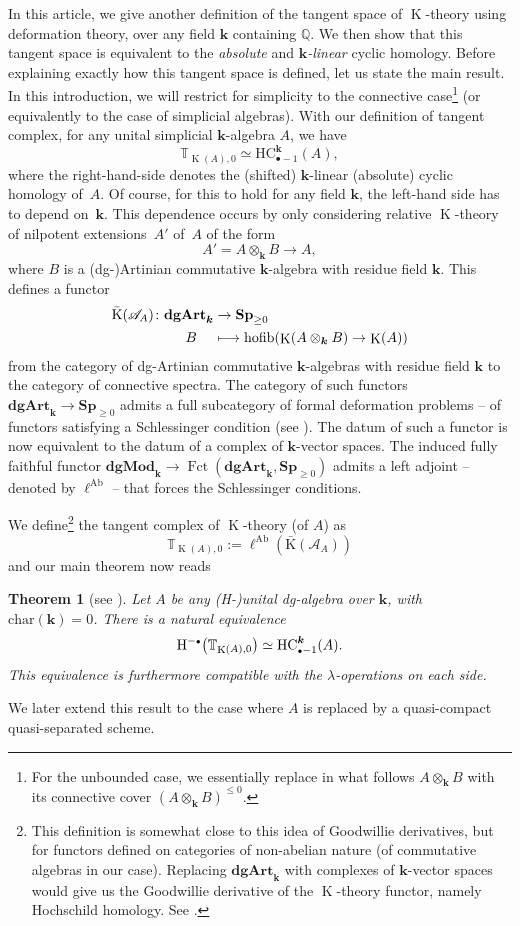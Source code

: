 \documentclass[JEP,XML,SOM,Unicode,NoEqCountersInSection]{cedram}
\let\mathcal\mathscr
\let\autoref\Cref
\newcommand\mto{\mathchoice{\longmapsto}{\mapsto}{\mapsto}{\mapsto}}
\let\ra\rightarrow
\let\widebar\bar
\newcounter{condition}
\newcommand{\sbullet}{{\scriptscriptstyle\bullet}}
\newtheorem{thmintro}{Theorem}
\theoremstyle{definition}
\newcommand{\Q}{\mathbb{Q}}
\newcommand{\T}{\mathbb{T}}
\newcommand{\Sp}{\mathbf{Sp}}
\newcommand{\dgArt}{\mathbf{dgArt}}
\newcommand{\dgMod}{\mathbf{dgMod}}
\DeclareMathOperator{\Fct}{Fct}
\DeclareMathOperator{\K}{K}
\newcommand{\homol}{\mathrm H}
\let\originalleft\left
\let\originalright\right
\renewcommand{\left}{\mathopen{}\mathclose\bgroup\originalleft}
\renewcommand{\right}{\aftergroup\egroup\originalright}
\newcommand{\bK}{\widebar{\mathrm{K}}}
\newcommand{\HC}{\mathrm{HC}}
\renewcommand{\k}{{\boldsymbol{k}}}
\newcommand{\ellAb}{\operatorname{\ell^{Ab}}}
\newcommand{\Ac}{\mathcal{A}}
\newcommand{\hofib}{\operatorname{hofib}}
\begin{document}
In this article, we give another definition of the tangent space of $\K$-theory using deformation theory, over any field $\k$ containing $\Q$. We then show that this tangent space is equivalent to the \emph{absolute} and \emph{$\k$-linear} cyclic homology. Before explaining exactly how this tangent space is defined, let us state the main result. In this introduction, we will restrict for simplicity to the connective case\footnote{For the unbounded case, we essentially replace in what follows $A \otimes_\k B$ with its connective cover $(A \otimes_\k B)^{\leq 0}$.} (or equivalently to the case of simplicial algebras).
With our definition of tangent complex, for any unital simplicial $\k$-algebra $A$, we have
\[
\T_{\K(A),0} \simeq \HC_{\sbullet-1}^\k(A),
\]
where the right-hand-side denotes the (shifted) $\k$-linear (absolute) cyclic homology of~$A$. Of course, for this to hold for any field $\k$, the left-hand side has to depend on~$\k$.
This dependence occurs by only considering relative $\K$-theory of nilpotent exten\-sions~$A'$ of~$A$ of the form
\[
A' = A \otimes_\k B \to A,
\]
where $B$ is a (dg-)Artinian commutative $\k$-algebra with residue field $\k$.
This defines a functor
\begin{align*}
\bK(\Ac_A) \colon \dgArt_\k &\to \Sp_{\geq 0} \\
B \hspace{1.2em} & \mto \hofib\left(\K\left(A \otimes_\k B\right) \ra \K(A) \right)
\end{align*}
from the category of dg-Artinian commutative $\k$-algebras with residue field $\k$ to the category of connective spectra.
The category of such functors $\dgArt_\k \to \Sp_{\geq 0}$ admits a full subcategory of formal deformation problems -- \ie of functors satisfying a Schlessinger condition (see \autoref{df:schlessinger}). The datum of such a functor is now equivalent to the datum of a complex of $\k$-vector spaces.
The induced fully faithful functor $\dgMod_\k \to \Fct(\dgArt_\k, \Sp_{\geq 0})$ admits a left adjoint -- denoted by $\ellAb$ -- that forces the Schlessinger conditions.

We define\footnote{This definition is somewhat close to this idea of Goodwillie derivatives, but for functors defined on categories of non-abelian nature (of commutative algebras in our case). Replacing $\dgArt_\k$ with complexes of $\k$-vector spaces would give us the Goodwillie derivative of the $\K$-theory functor, namely Hochschild homology. See \autoref{rmk:goodwilliederivative}.}
the tangent complex of $\K$-theory (of $A$) as
\[
\T_{\K(A),0} := \ellAb(\bK(\Ac_A))
\]
and our main theorem now reads
\begin{thmintro}[see \autoref{cor:tgtK}]\label{thmintro}
Let $A$ be any (H-)unital dg-algebra over $\k$, with $\mathrm{char}(\k) = 0$.
There is a natural equivalence
\[
\homol^{-\sbullet}\left(\T_{\K(A),0} \right) \simeq \HC_{\sbullet-1}^\k(A).
\]
This equivalence is furthermore compatible with the $\lambda$-operations on each side.
\end{thmintro}
\noindent We later extend this result to the case where $A$ is replaced by a quasi-compact quasi-separated scheme.
\end{document}

